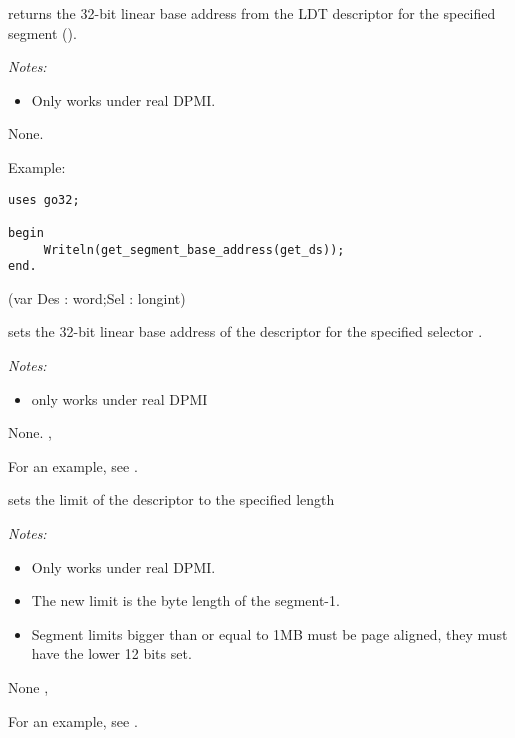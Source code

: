 {
 returns the 32-bit linear base address 
from the LDT descriptor for the specified segment ().


{\em Notes:}
\begin{itemize}
\item Only works under real DPMI.
\end{itemize}
}
{None.}
{}

\begin{FPCList}
\item[Example:]
\begin{verbatim}
uses go32;

begin
     Writeln(get_segment_base_address(get_ds));
end.
\end{verbatim}
\end{FPCList}

{(var Des : word;Sel : longint)}
{ sets the 32-bit linear base address 
of the descriptor  for the specified selector .

{\em Notes:}
\begin{itemize}
\item only works under real DPMI
\end{itemize}
}
{None.}
{ , }

For an example, see .

{ sets the limit of the descriptor  
to the specified length 

{\em Notes:}
\begin{itemize}
\item Only works under real DPMI.
\item The new limit is the byte length of the segment-1.
\item Segment limits bigger than or equal to 1MB must be page aligned, they
must have the lower 12 bits set.
\end{itemize}
}
{None}
{ , }

For an example, see .


